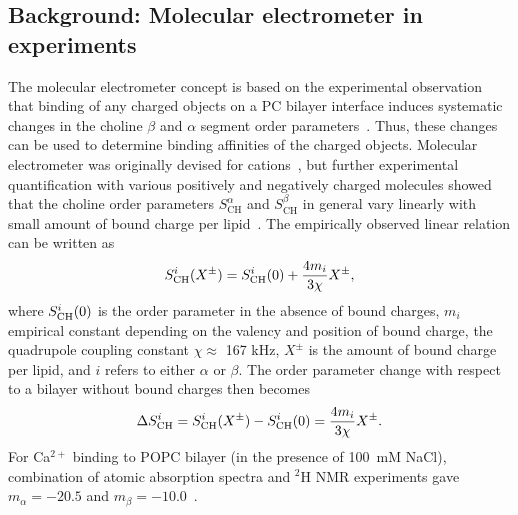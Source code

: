 \documentclass[twoside,twocolumn,9pt]{article}
\begin{document}
\subsection{Background: Molecular electrometer in experiments}\label{conceptinexperiments}
The molecular electrometer concept is based on the experimental observation that
binding of any charged objects on a PC bilayer interface induces systematic changes in the choline $\beta$ and $\alpha$
segment order parameters~\cite{akutsu81,altenbach84,altenbach85,seelig87,macdonald87,scherer89,roux90,beschiasvili91,marassi92,rydall92}.
Thus, these changes can be used to determine binding affinities of the charged objects.
Molecular electrometer was originally devised for cations~\cite{akutsu81,altenbach84}, but
further experimental quantification with various positively and negatively charged 
molecules showed that the choline order parameters $S_\mathrm{CH}^\alpha$ and $S_\mathrm{CH}^\beta$ 
in general vary linearly with small amount of bound charge per 
lipid~\cite{altenbach84,altenbach85,seelig87,macdonald87,scherer89,roux90,beschiasvili91,marassi92,rydall92}. 
The empirically observed linear relation can be written as~\cite{ferreira16}
\begin{equation}\label{electrometer_eq}
S_{\rm{CH}}^{i}(X^\pm)=S_{\rm{CH}}^{i}(0) + \frac{4m_i}{3\chi} X^\pm,
\end{equation}
where $S_{\rm{CH}}^{i}(0)$ is the order parameter in the absence of bound charges,
$m_i$ empirical constant depending on the valency and position of bound charge,
the quadrupole coupling constant $\chi \approx$ 167 kHz, $X^\pm$ is the amount of bound charge per lipid, and
$i$ refers to either $\alpha$ or $\beta$.
The order parameter change with respect to a bilayer without bound charges then becomes
\begin{equation}\label{OPchangeEQ}
\Delta S_{\rm{CH}}^{i}= S_{\rm{CH}}^{i}(X^\pm)-S_{\rm{CH}}^{i}(0) =\frac{4m_i }{3\chi}X^\pm.
\end{equation}
For Ca$^{2+}$ binding to POPC bilayer (in the presence of 100~mM NaCl),
combination of atomic absorption spectra and $^2$H NMR experiments gave
$m_\alpha=-20.5$  and $m_\beta=-10.0$~\cite{altenbach84}.
\end{document}
